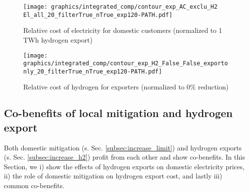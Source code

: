 \begin{figure*}[h!]
    \centering
    \begin{subfigure}[b]{0.49\linewidth}
        \centering
        \texttt{[image: graphics/integrated\_comp/contour\_exp\_AC\_exclu\_H2 El\_all\_20\_filterTrue\_nTrue\_exp120-PATH.pdf]}
        \caption{Relative cost of electricity for domestic customers (normalized to 1 TWh hydrogen export)}
        \label{fig:expense_ac_120}
    \end{subfigure}
    \hfill
    \begin{subfigure}[b]{0.49\linewidth}
        \centering
        \texttt{[image: graphics/integrated\_comp/contour\_exp\_H2\_False\_False\_exportonly\_20\_filterTrue\_nTrue\_exp120-PATH.pdf]}
        \caption{Relative cost of hydrogen for exporters (normalized to 0\% \co reduction)}
        \label{fig:expense_h2_120}
    \end{subfigure}
    \hfill
    \caption{  
    Cost for domestic electricity consumers (\ref{fig:expense_ac_120}) and hydrogen exporters (\ref{fig:expense_h2_120}),
    normalized to costs at 1 TWh hydrogen export (\ref{fig:expense_ac_120}) and
    to 0\% \co reduction (\ref{fig:expense_h2_120})
    at each mitigation level. Domestic electricity consumers profit from increasing hydrogen exports, especially at low domestic mitigation and high exports. Hydrogen exporters profit from domestic mitigation at medium mitigation efforts. Both (\ref{fig:expense_ac_120}) and (\ref{fig:expense_h2_120}) include possible pathways of i) quick exports and slow mitigation, ii) balanced exports and mitigation and iii) slow exports and quick mitigation. Years are illustrative.}
    \label{fig:expenses_default_120}
\end{figure*}







\subsection{Co-benefits of local mitigation and hydrogen export}
\label{subsec:benefits}

Both domestic mitigation (s. Sec. \ref{subsec:increase_limit}) and hydrogen exports (s. Sec. \ref{subsec:increase_h2}) profit from each other and show co-benefits. In this Section, we i) show the effects of hydrogen exports on domestic electricity prices, ii) the role of domestic mitigation on hydrogen export cost, and lastly iii) common co-benefits.

